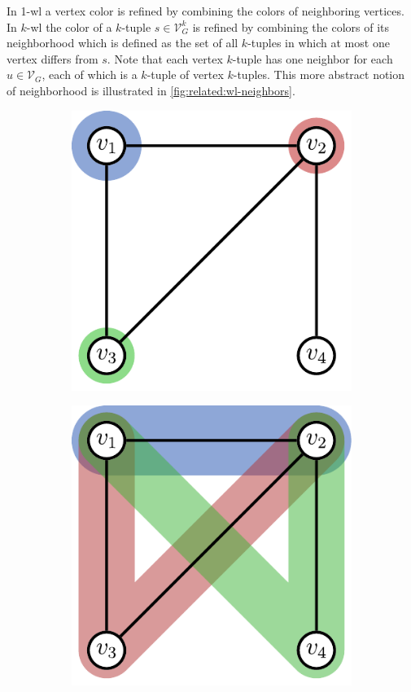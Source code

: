 In 1-\acs{wl} a vertex color is refined by combining the colors of neighboring vertices.
In $k$-\acs{wl} the color of a $k$-tuple $s \in \mathcal{V}_G^k$ is refined by combining the colors of its neighborhood which is defined as the set of all $k$-tuples in which at most one vertex differs from $s$.
Note that each vertex $k$-tuple has one neighbor for each $u \in \mathcal{V}_G$, each of which is a $k$-tuple of vertex $k$-tuples.
This more abstract notion of neighborhood is illustrated in \cref{fig:related:wl-neighbors}.
\begin{figure}[ht]
	\centering
	\begin{subfigure}{0.33\textwidth}
		\centering
		\includegraphics[width=0.8\linewidth]{gfx/related-work/wl1-neighbors.pdf}
		\label{fig:related:wl-neighbors:1}
	\end{subfigure}%
	\begin{subfigure}{0.33\textwidth}
		\centering
		\includegraphics[width=0.8\linewidth]{gfx/related-work/wl2-neighbors.pdf}

\end{subfigure}
\end{figure}
